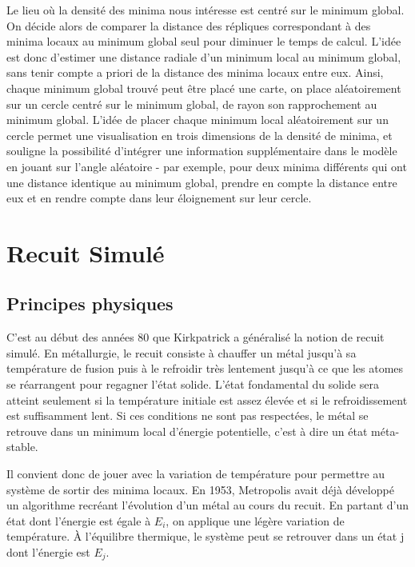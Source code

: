 \documentclass{article}%
\begin{document}
      Le lieu où la densité des minima nous intéresse est centré sur le minimum global.  On décide alors de comparer la distance des répliques correspondant à des minima locaux au minimum global seul pour diminuer le temps de calcul.
      L’idée est donc d’estimer une distance radiale d’un minimum local au minimum global, sans tenir compte a priori de la distance des minima locaux entre eux. Ainsi, chaque minimum global trouvé peut être placé une carte, on place aléatoirement sur un cercle centré sur le minimum global, de rayon son rapprochement au minimum global.
      L’idée de placer chaque minimum local aléatoirement sur un cercle permet une visualisation en trois dimensions de la densité de minima, et souligne la possibilité d’intégrer une information supplémentaire dans le modèle en jouant sur l’angle aléatoire - par exemple, pour deux minima différents qui ont une distance identique au minimum global, prendre en compte la distance entre eux et en rendre compte dans leur éloignement sur leur cercle.

\clearpage

\section{Recuit Simulé}

\subsection{Principes physiques}

	C'est au début des années 80 que Kirkpatrick a généralisé la notion de recuit simulé. En métallurgie, le recuit consiste à chauffer un métal jusqu'à sa température de fusion puis à le refroidir très lentement jusqu'à ce que les atomes se réarrangent pour regagner l'état solide. L'état fondamental du solide sera atteint seulement si la température initiale est assez élevée et si le refroidissement est suffisamment lent. Si ces conditions ne sont pas respectées, le métal se retrouve dans un minimum local d'énergie potentielle, c'est à dire un état méta-stable.
	
	Il convient donc de jouer avec la variation de température pour permettre au système de sortir des minima locaux. En 1953, Metropolis avait déjà développé un algorithme recréant l'évolution d'un métal au cours du recuit. En partant d'un état dont l'énergie est égale à $E_i$, on applique une légère variation de température. À l'équilibre thermique, le système peut se retrouver dans un état j dont l'énergie est $E_j$.
	
\end{document}
